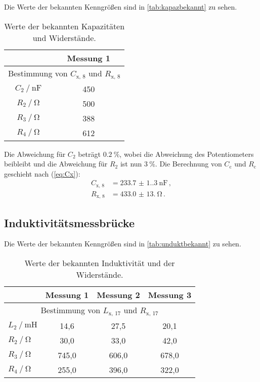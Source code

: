 Die Werte der bekannten Kenngrößen sind in \autoref{tab:kapazbekannt} zu sehen.
\begin{table}
  \centering
  \caption{Werte der bekannten Kapazitäten und Widerstände.}
  \label{tab:kapazbekannt}
  \begin{tabular}{cc}
    \toprule
     & Messung 1  \\
    \midrule
    \multicolumn{2}{c}{ Bestimmung von $C_{\text{x, 8}}$ und $R_{\text{x, 8}}$ } \\
    $C_2 \mathbin{/} \unit{\nano\farad}$     & 450 \\
    $R_2 \mathbin{/} \unit{\ohm}$            & 500 \\
    $R_3 \mathbin{/} \unit{\ohm}$            & 388 \\
    $R_4 \mathbin{/} \unit{\ohm}$            & 612 \\
    \bottomrule
  \end{tabular}
\end{table}

Die Abweichung für $C_2$ beträgt $\qty{0.2}{\percent}$, wobei die Abweichung des Potentiometers beibleibt
und die Abweichung für $R_2$ ist nun $\qty{3}{\percent}$. 
Die Berechnung von $C_\text{c}$ und $R_\text{c}$ geschieht nach (\ref{eq:Cx}):
\begin{align*}
  C_\text{x, 8} &= \qty{233.7(1.3)}{\nano\farad} \, , \\
  R_\text{x, 8} &= \qty{433.0(13.0)}{\ohm} \, .
\end{align*}


\subsection{Induktivitätsmessbrücke} \label{sec:induktausw}

Die Werte der bekannten Kenngrößen sind in \autoref{tab:unduktbekannt} zu sehen.
\begin{table}
  \centering
  \caption{Werte der bekannten Induktivität und der Widerstände.}
  \label{tab:unduktbekannt}
  \begin{tabular}{lccc}
    \toprule
     & Messung 1 & Messung 2 & Messung 3  \\
    \midrule
    \multicolumn{4}{c}{ Bestimmung von $L_{\text{x, 17}}$ und $R_{\text{x, 17}}$ } \\
    $L_2 \mathbin{/} \unit{\milli\henry}$ &  14,6 &  27,5 &  20,1\\
    $R_2 \mathbin{/} \unit{\ohm}$         &  30,0 &  33,0 &  42,0\\
    $R_3 \mathbin{/} \unit{\ohm}$         & 745,0 & 606,0 & 678,0\\
    $R_4 \mathbin{/} \unit{\ohm}$         & 255,0 & 396,0 & 322,0\\
    \bottomrule
  \end{tabular}
\end{table}

